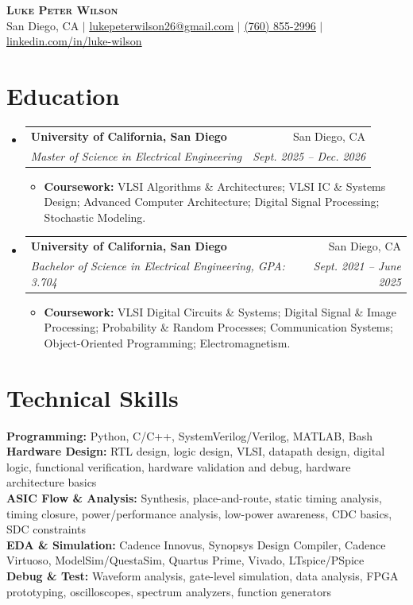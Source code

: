 \documentclass[letterpaper,10pt]{article}
\makeatletter
\newcommand{\resumeItem}[1]{\item \small{#1}}
\newcommand{\resumeSubheading}[4]{
  \vspace{1pt}\item
    \begin{tabular*}{0.97\textwidth}[t]{l@{\extracolsep{\fill}}r}
      \textbf{#1} & #2 \\
      \textit{\small #3} & \textit{\small #4} \\
    \end{tabular*}\vspace{-1pt}
}
\newcommand{\resumeItemListStart}{\begin{itemize}[leftmargin=0.18in, itemsep=0pt, topsep=1pt]}
\newcommand{\resumeItemListEnd}{\end{itemize}\vspace{-2pt}}
\newcommand{\resumeSubHeadingListStart}{\begin{itemize}[leftmargin=0.15in, label={}]}
\newcommand{\resumeSubHeadingListEnd}{\end{itemize}\vspace{-1pt}}
\makeatother
\begin{document}
\begin{center}
    \textbf{\Huge \scshape Luke Peter Wilson} \\ \vspace{2pt}
    \small San Diego, CA $|$
    \href{mailto:lukepeterwilson26@gmail.com}{\underline{lukepeterwilson26@gmail.com}} $|$
    \href{tel:+17608552996}{\underline{(760) 855-2996}} $|$
    \href{https://www.linkedin.com/in/luke-wilson-33718b238/}{\underline{linkedin.com/in/luke-wilson}}
\end{center}

\section{Education}
\resumeSubHeadingListStart
  \resumeSubheading
    {University of California, San Diego}{San Diego, CA}
    {Master of Science in Electrical Engineering}{Sept. 2025 -- Dec. 2026}
    \resumeItemListStart
      \resumeItem{\textbf{Coursework:} VLSI Algorithms \& Architectures; VLSI IC \& Systems Design; Advanced Computer Architecture; Digital Signal Processing; Stochastic Modeling.}
    \resumeItemListEnd

  \resumeSubheading
    {University of California, San Diego}{San Diego, CA}
    {Bachelor of Science in Electrical Engineering, GPA: 3.704}{Sept. 2021 -- June 2025}
    \resumeItemListStart
      \resumeItem{\textbf{Coursework:} VLSI Digital Circuits \& Systems; Digital Signal \& Image Processing; Probability \& Random Processes; Communication Systems; Object-Oriented Programming; Electromagnetism.}
    \resumeItemListEnd
\resumeSubHeadingListEnd

\section{Technical Skills}
\begin{itemize}[leftmargin=0.15in, label={}]
  \small{\item{
    \textbf{Programming:} Python, C/C++, SystemVerilog/Verilog, MATLAB, Bash \\
    \textbf{Hardware Design:} RTL design, logic design, VLSI, datapath design, digital logic, functional verification, hardware validation and debug, hardware architecture basics \\
    \textbf{ASIC Flow \& Analysis:} Synthesis, place-and-route, static timing analysis, timing closure, power/performance analysis, low-power awareness, CDC basics, SDC constraints \\
    \textbf{EDA \& Simulation:} Cadence Innovus, Synopsys Design Compiler, Cadence Virtuoso, ModelSim/QuestaSim, Quartus Prime, Vivado, LTspice/PSpice \\
    \textbf{Debug \& Test:} Waveform analysis, gate-level simulation, data analysis, FPGA prototyping, oscilloscopes, spectrum analyzers, function generators
  }}
\end{itemize}
\end{document}
